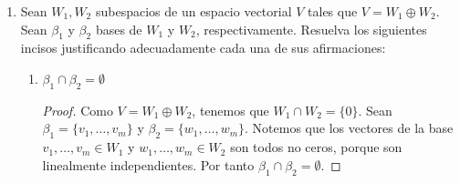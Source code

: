 \documentclass[11pt,letterpaper]{article}
\newcommand{\R}{\mathbb{R}}
\begin{document}
\begin{enumerate}
\begin{enumerate}[label=(\alph*)]
\begin{proof}
        Para mostrar que $W_1 + W_2 = \mathscr{F} (\R, \R)$ se tiene que para cualquier
        $f \in \mathscr{F} (\R, \R)$ definimos $f_p$ y $f_i$ funciones por
        \[
            f_p(x) = \frac{f(x) + f(-x)}{2} \quad \text{ y } \quad
            f_i(x) = \frac{f(x) - f(-x)}{2}
        \]
        Comprobemos que $f_p \in W_1$ es par,
        \[ f_p(-x) = \frac{f(-x) + f(x)}{2} = \frac{f(x) + f(-x)}{2} = f_p(x)\] 
        Comprobemos que $f_i \in W_2$ es impar,
        \[ f_i(-x) = \frac{f(-x) - f(x)}{2} = \frac{-f(x) + f(-x)}{2} = 
            \frac{f(x) - f(-x)}{2} = -f_i(x)\] 
        También se tiene que,
        \[ (f_p + f_i) (x) =
            \frac{f(-x)+f(x)}{2} + \frac{f(-x) - f(x)}{2} = f(x) \]
        así $f_p + f_i = f$, lo cual muestra que cada función $f$ puede ser escrita como una suma de
        una función par $f_p$ y una impar $f_i$, teniendo así que $W_1 + W_2 = \mathscr{F} (\R, \R)$.

        Por tanto $\mathscr{F}(\R, \R) = W_1 \oplus W_2$.
    \end{proof}
\end{enumerate}

\item Sean $W_1, W_2$ subespacios de un espacio vectorial $V$ tales que $V = W_1 \oplus W_2$. Sean
$\beta_1$ y $\beta_2$ bases de $W_1$ y $W_2$, respectivamente. Resuelva los siguientes incisos
justificando adecuadamente cada una de sus afirmaciones:
\begin{enumerate}[label=(\alph*)]
    \item $\beta_1 \cap \beta_2 = \emptyset$
    \begin{proof}
        Como $V = W_1 \oplus W_2$, tenemos que $W_1 \cap W_2 = \{ 0 \}$. Sean
        $\beta_1 = \{ v_1, \ldots, v_m \}$ y $\beta_2 = \{ w_1, \ldots, w_m \}$. Notemos que los
        vectores de la base $v_1, \ldots, v_m  \in W_1$ y $w_1, \ldots, w_m \in W_2$ son todos no
        ceros, porque son linealmente independientes. Por tanto $\beta_1 \cap \beta_2 = \emptyset$.
    \end{proof}


\end{enumerate}
\end{enumerate}
\end{document}
